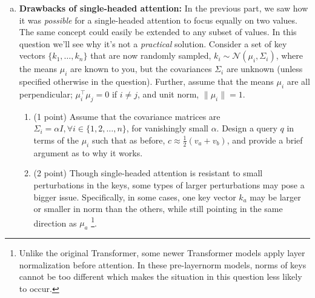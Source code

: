 \begin{enumerate}[(a)]



\item {}  \textbf{Drawbacks of single-headed attention:} \label{q_problem_with_single_head}
In the previous part, we saw how it was \textit{possible} for a single-headed attention to focus equally on two values.
The same concept could easily be extended to any subset of values.
In this question we'll see why it's not a \textit{practical} solution.
Consider a set of key vectors $\{k_1,\dots,k_n\}$ that are now randomly sampled, $k_i\sim \mathcal{N}(\mu_i, \Sigma_i)$, where the means $\mu_i$ are known to you, but the covariances $\Sigma_i$ are unknown (unless specified otherwise in the question).
Further, assume that the means $\mu_i$ are all perpendicular; $\mu_i^\top \mu_j = 0$ if $i\not=j$, and unit norm, $\|\mu_i\|=1$.

    \begin{enumerate}[label=\roman*.]
    \item (1 point) Assume that the covariance matrices are $\Sigma_i = \alpha I, \forall i \in \{1, 2, \ldots, n\}$, for vanishingly small $\alpha$.
    Design a query $q$ in terms of the $\mu_i$ such that as before, $c\approx \frac{1}{2}(v_a + v_b)$, and provide a brief argument as to why it works.


    \item (2 point) Though single-headed attention is resistant to small perturbations in the keys, some types of larger perturbations may pose a bigger issue. Specifically, in some cases, one key vector $k_a$ may be larger or smaller in norm than the others, while still pointing in the same direction as $\mu_a$ \footnote{Unlike the original Transformer, some newer Transformer models apply layer normalization before attention. In these pre-layernorm models, norms of keys cannot be too different which makes the situation in this question less likely to occur.}.
    

\end{enumerate}
\end{enumerate}
